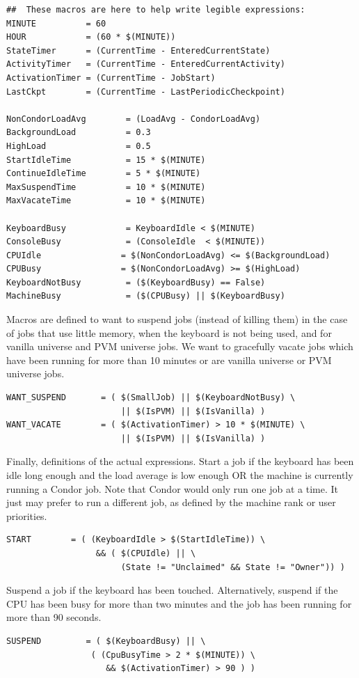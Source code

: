\begin{verbatim}
##  These macros are here to help write legible expressions:
MINUTE          = 60
HOUR            = (60 * $(MINUTE))
StateTimer      = (CurrentTime - EnteredCurrentState)
ActivityTimer   = (CurrentTime - EnteredCurrentActivity)
ActivationTimer = (CurrentTime - JobStart)
LastCkpt        = (CurrentTime - LastPeriodicCheckpoint)

NonCondorLoadAvg        = (LoadAvg - CondorLoadAvg)
BackgroundLoad          = 0.3
HighLoad                = 0.5
StartIdleTime           = 15 * $(MINUTE)
ContinueIdleTime        = 5 * $(MINUTE)
MaxSuspendTime          = 10 * $(MINUTE)
MaxVacateTime           = 10 * $(MINUTE)

KeyboardBusy            = KeyboardIdle < $(MINUTE)
ConsoleBusy             = (ConsoleIdle  < $(MINUTE))
CPUIdle                = $(NonCondorLoadAvg) <= $(BackgroundLoad)
CPUBusy                = $(NonCondorLoadAvg) >= $(HighLoad)
KeyboardNotBusy         = ($(KeyboardBusy) == False)
MachineBusy             = ($(CPUBusy) || $(KeyboardBusy)
\end{verbatim}

Macros are defined to want to suspend jobs (instead of
killing them) in the case of jobs that use little memory,
when the keyboard is not being used, and for vanilla universe
and PVM universe jobs.
We want to gracefully vacate jobs which
have been running for more than 10 minutes
or are vanilla universe or PVM universe jobs.
\begin{verbatim}
WANT_SUSPEND       = ( $(SmallJob) || $(KeyboardNotBusy) \
                       || $(IsPVM) || $(IsVanilla) )
WANT_VACATE        = ( $(ActivationTimer) > 10 * $(MINUTE) \
                       || $(IsPVM) || $(IsVanilla) )
\end{verbatim}

Finally, definitions of the actual expressions.
Start a job if 
the keyboard has been idle long enough and
the load average is low enough OR the machine is currently
running a Condor job.
Note that Condor would only run one job at a time.
It just may prefer to run a different job, as defined by
the machine rank or user priorities.
\begin{verbatim}
START        = ( (KeyboardIdle > $(StartIdleTime)) \
                  && ( $(CPUIdle) || \
                       (State != "Unclaimed" && State != "Owner")) )
\end{verbatim}

Suspend a job if the keyboard has been touched.
Alternatively, suspend if the CPU has been busy for more than two minutes
and the job has been running for more than 90 seconds.
\begin{verbatim}
SUSPEND         = ( $(KeyboardBusy) || \
                 ( (CpuBusyTime > 2 * $(MINUTE)) \
                    && $(ActivationTimer) > 90 ) )
\end{verbatim}

